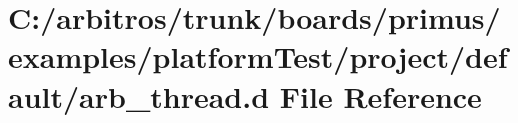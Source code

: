 \hypertarget{boards_2primus_2examples_2platform_test_2project_2default_2arb__thread_8d}{\section{C\-:/arbitros/trunk/boards/primus/examples/platform\-Test/project/default/arb\-\_\-thread.d File Reference}
\label{boards_2primus_2examples_2platform_test_2project_2default_2arb__thread_8d}
}
